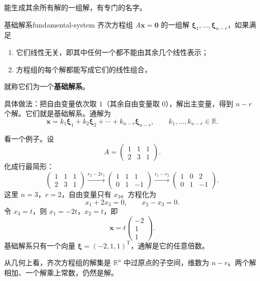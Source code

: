 能生成其余所有解的一组解，有专门的名字。
\begin{mydef}{基础解系}{fundamental-system}
齐次方程组 \(A\boldsymbol x=\boldsymbol 0\) 的一组解 \(\boldsymbol\xi_1,\ldots,\boldsymbol\xi_{n-r}\)，如果满足
\begin{enumerate}
\item 它们线性无关，即其中任何一个都不能由其余几个线性表示；
\item 方程组的每个解都能写成它们的线性组合，
\end{enumerate}
就称它们为一个\textbf{基础解系}。
\end{mydef}

具体做法：把自由变量依次取 \(1\)（其余自由变量取 \(0\)），解出主变量，得到 \(n-r\) 个解。它们就是基础解系。通解为
\[
\boldsymbol x=k_1\boldsymbol\xi_1+k_2\boldsymbol\xi_2+\cdots+k_{n-r}\boldsymbol\xi_{n-r},
\qquad k_1,\ldots,k_{n-r}\in\mathbb R.
\]

看一个例子。设
\[
A=\begin{pmatrix}1&1&1\\2&3&1\end{pmatrix}.
\]
化成行最简形：
\[
\begin{pmatrix}1&1&1\\2&3&1\end{pmatrix}
\xrightarrow{r_2-2r_1}
\begin{pmatrix}1&1&1\\0&1&-1\end{pmatrix}
\xrightarrow{r_1-r_2}
\begin{pmatrix}1&0&2\\0&1&-1\end{pmatrix}.
\]
这里 \(n=3\)，\(r=2\)，自由变量只有 \(x_3\)。方程化为
\[
x_1+2x_3=0,\qquad x_2-x_3=0.
\]
令 \(x_3=t\)，则 \(x_1=-2t\)，\(x_2=t\)，即
\[
\boldsymbol x=t\begin{pmatrix}-2\\1\\1\end{pmatrix}.
\]
基础解系只有一个向量 \(\boldsymbol\xi=(-2,1,1)^{\mathrm T}\)，通解是它的任意倍数。

从几何上看，齐次方程组的解集是 \(\mathbb R^n\) 中过原点的子空间，维数为 \(n-r\)。两个解相加、一个解乘上常数，仍然是解。

\begin{center}
\end{center}

